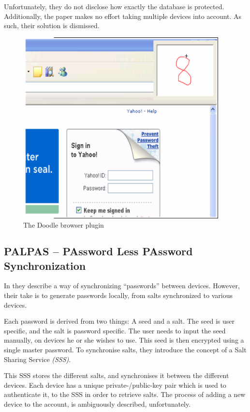 			Unfortunately, they do not disclose how exactly the database is protected. Additionally, the paper makes no effort taking multiple devices into account. As such, their solution is dismissed.

			\begin{figure}[htbp]
				\centering
				\includegraphics[width=0.95\textwidth]{figures/analysis/doodle.png}
				\caption{The Doodle browser plugin}
				\label{fig:doodle}
			\end{figure}

		\subsection*{PALPAS -- PAssword Less PAssword Synchronization}
			In \cite{palpas} they describe a way of synchronizing ``passwords'' between devices. However, their take is to generate passwords locally, from salts synchronized to various devices.

			Each password is derived from two things: A seed and a salt. The seed is user specific, and the salt is password specific. The user needs to input the seed manually, on devices he or she wishes to use. This seed is then encrypted using a single master password. To synchronise salts, they introduce the concept of a Salt Sharing Service \emph{(SSS)}.

			This SSS stores the different salts, and synchronises it between the different devices. Each device has a unique private-/public-key pair which is used to authenticate it, to the SSS in order to retrieve salts. The process of adding a new device to the account, is ambiguously described, unfortunately.

